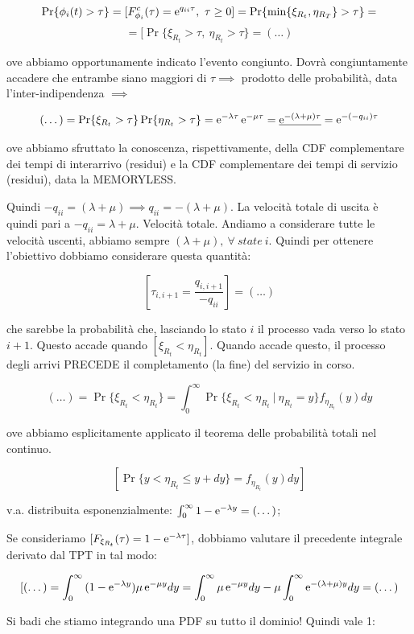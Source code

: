 \[
	\Pr\{\phi_i(t) > \tau\} = [F_{\phi_i}^c(\tau) = \mathop{}\!\mathrm{e}^{q_{ii}\tau},\ \tau\geq 0] = \Pr\{\min\{\xi_{R_t}, \eta_{R_T}\} > \tau\} =
\]
\[
	= [\Pr\{\xi_{R_t} > \tau,\ \eta_{R_t} > \tau\} = (\dots)
\]
	
ove abbiamo opportunamente indicato l'evento congiunto. Dovrà congiuntamente accadere che entrambe siano maggiori di $\tau \implies$ prodotto delle probabilità, data l'inter-indipendenza $\implies$

\[
	(\dots) = \Pr\{\xi_{R_t} > \tau\}\Pr\{\eta_{R_t} > \tau\} = \mathop{}\!\mathrm{e}^{-\lambda\tau}\mathop{}\!\mathrm{e}^{-\mu\tau} = \underline{\mathop{}\!\mathrm{e}^{-(\lambda+\mu)\tau}} = \mathop{}\!\mathrm{e}^{-(-q_{ii})\tau}
\]

ove abbiamo sfruttato la conoscenza, rispettivamente, della CDF complementare dei tempi di interarrivo (residui) e la CDF complementare dei tempi di servizio (residui), data la MEMORYLESS.

Quindi $-q_{ii} = (\lambda+\mu) \implies q_{ii} = -(\lambda+\mu)$. La velocità totale di uscita è quindi pari a $-q_{ii} = \lambda+\mu$. Velocità totale. Andiamo a considerare tutte le velocità uscenti, abbiamo sempre $(\lambda+\mu),\ \forall\ state\ i$. Quindi per ottenere l'obiettivo dobbiamo considerare questa quantità:

\[
	[\tau_{i,i+1} = \frac{q_{i,i+1}}{-q_{ii}}] = (\dots)
\]

che sarebbe la probabilità che, lasciando lo stato $i$ il processo vada verso lo stato $i+1$. Questo accade quando $[\xi_{R_t} < \eta_{R_t}]$. Quando accade questo, il processo degli arrivi PRECEDE il completamento (la fine) del servizio in corso.

\[
	(\dots) = \Pr\{\xi_{R_t} < \eta_{R_t}\} = \int_0^\infty{\Pr\{\xi_{R_t} < \eta_{R_t}\ |\ \eta_{R_t} = y\}f_{\eta_{R_t}}(y)dy}
\]

ove abbiamo esplicitamente applicato il teorema delle probabilità totali nel continuo.

\[
	[\Pr\{y < \eta_{R_t} \leq y+dy\} = f_{\eta_{R_t}}(y)dy]
\]

v.a. distribuita esponenzialmente: $\int_0^\infty{1-\mathop{}\!\mathrm{e}^{-\lambda y}} = (\dots)$;

Se consideriamo $[F_{\xi_{R_t}}(\tau) = 1-\mathop{}\!\mathrm{e}^{-\lambda\tau}]$, dobbiamo valutare il precedente integrale derivato dal TPT in tal modo: 

\[
	[(\dots) = \int_0^\infty{(1-\mathop{}\!\mathrm{e}^{-\lambda y})\mu\mathop{}\!\mathrm{e}^{-\mu y}dy} = \int_0^\infty{\mu\mathop{}\!\mathrm{e}^{-\mu y}dy} - \mu\int_0^\infty{\mathop{}\!\mathrm{e}^{-(\lambda+\mu)y}dy} = (\dots)
\]

Si badi che stiamo integrando una PDF su tutto il dominio! Quindi vale 1:

